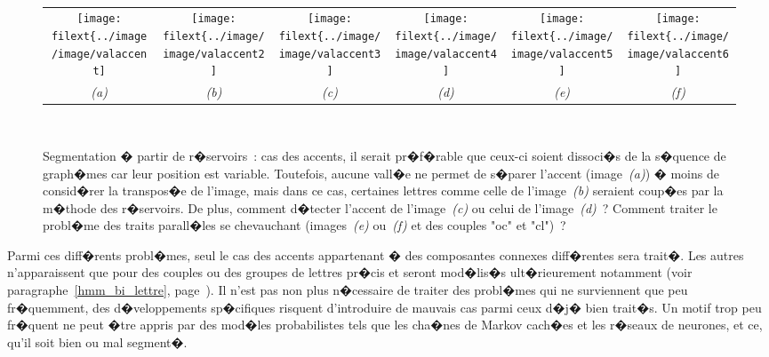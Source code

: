             \begin{figure}[ht]
        $$\begin{tabular}{|c|c|c|c|c|c|} \hline
        \texttt{[image: \\filext\{../image/image/valaccent]}}     &
        \texttt{[image: \\filext\{../image/image/valaccent2]}}     &
        \texttt{[image: \\filext\{../image/image/valaccent3]}}         &
        \texttt{[image: \\filext\{../image/image/valaccent4]}}         &
        \texttt{[image: \\filext\{../image/image/valaccent5]}}         &
        \texttt{[image: \\filext\{../image/image/valaccent6]}} 
        \\ \textit{(a)} & \textit{(b)} & \textit{(c)} & \textit{(d)} & \textit{(e)} & \textit{(f)} 
        \\ \hline
        \end{tabular}$$
        \caption{    Segmentation � partir de r�servoirs~: cas des accents, il serait pr�f�rable que 
                            ceux-ci soient dissoci�s de la s�quence de graph�mes car leur position est variable.
                            Toutefois, aucune vall�e ne permet de s�parer l'accent (image~\textit{(a)}) 
                            � moins de consid�rer la transpos�e de l'image, mais dans ce cas, certaines lettres comme celle 
                            de l'image~\textit{(b)} seraient coup�es par la m�thode des r�servoirs. 
                            De plus, comment d�tecter l'accent de l'image~\textit{(c)} 
                            ou celui de l'image~\textit{(d)}~? Comment traiter le probl�me des traits 
                            parall�les se chevauchant (images~\textit{(e)} ou~\textit{(f)} et des couples "oc" et "cl")~?
                            } 
        \label{image_graphem_reservoir_decouper_accent}
            \end{figure}


Parmi ces diff�rents probl�mes, seul le cas des accents appartenant � des composantes connexes diff�rentes sera trait�. Les autres n'apparaissent que pour des couples ou des groupes de lettres pr�cis et seront mod�lis�s ult�rieurement notamment (voir paragraphe~\ref{hmm_bi_lettre}, page~\pageref{hmm_bi_lettre}). Il n'est pas non plus n�cessaire de traiter des probl�mes qui ne surviennent que peu fr�quemment, des d�veloppements sp�cifiques risquent d'introduire de mauvais cas parmi ceux d�j� bien trait�s. Un motif trop peu fr�quent ne peut �tre appris par des mod�les probabilistes tels que les cha�nes de Markov cach�es et les r�seaux de neurones, et ce, qu'il soit bien ou mal segment�.


